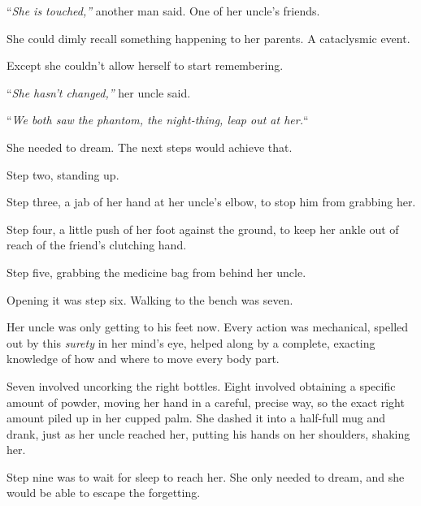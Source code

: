 ``\emph{She is touched,'' }another man said.  One of her uncle's friends.



She could dimly recall something happening to her parents.  A cataclysmic event.



Except she couldn't allow herself to start remembering.



``\emph{She hasn't changed,'' }her uncle said.



``\emph{We both saw the phantom, the night-thing, leap out at her.}``



She needed to dream.  The next steps would achieve that.



Step two, standing up.



Step three, a jab of her hand at her uncle's elbow, to stop him from grabbing her.



Step four, a little push of her foot against the ground, to keep her ankle out of reach of the friend's clutching hand.



Step five, grabbing the medicine bag from behind her uncle.



Opening it was step six.  Walking to the bench was seven.



Her uncle was only getting to his feet now.  Every action was mechanical, spelled out by this \emph{surety} in her mind's eye, helped along by a complete, exacting knowledge of how and where to move every body part.



Seven involved uncorking the right bottles.  Eight involved obtaining a specific amount of powder, moving her hand in a careful, precise way, so the exact right amount piled up in her cupped palm.  She dashed it into a half-full mug and drank, just as her uncle reached her, putting his hands on her shoulders, shaking her.



Step nine was to wait for sleep to reach her.  She only needed to dream, and she would be able to escape the forgetting.



\sectionbreak



